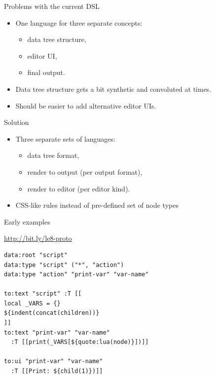 \documentclass[handout]{beamer}
\begin{document}

\begin{frame}{Problems with the current DSL}

\begin{itemize}
\item One language for three separate concepts:
\begin{itemize}
  \item data tree structure,
  \item editor UI,
  \item final output.
\end{itemize}
\item Data tree structure gets a bit synthetic and convoluted at times.
\item Should be easier to add alternative editor UIs.
\end{itemize}

\end{frame}


\begin{frame}{Solution}

\begin{itemize}
\item Three separate sets of languages:
\begin{itemize}
  \item data tree format,
  \item render to output (per output format),
  \item render to editor (per editor kind).
\end{itemize}
\item CSS-like rules instead of pre-defined set of node types
\end{itemize}

\end{frame}


\begin{frame}[fragile]{Early examples}

\url{http://bit.ly/le8-proto}

\begin{verbatim}
data:root "script"
data:type "script" ("*", "action")
data:type "action" "print-var" "var-name"

to:text "script" :T [[
local _VARS = {}
${indent(concat(children))}
]]
to:text "print-var" "var-name"
  :T [[print(_VARS[${quote:lua(node)}])]]

to:ui "print-var" "var-name"
  :T [[Print: ${child(1)})]]
\end{verbatim}

\end{frame}
\end{document}
